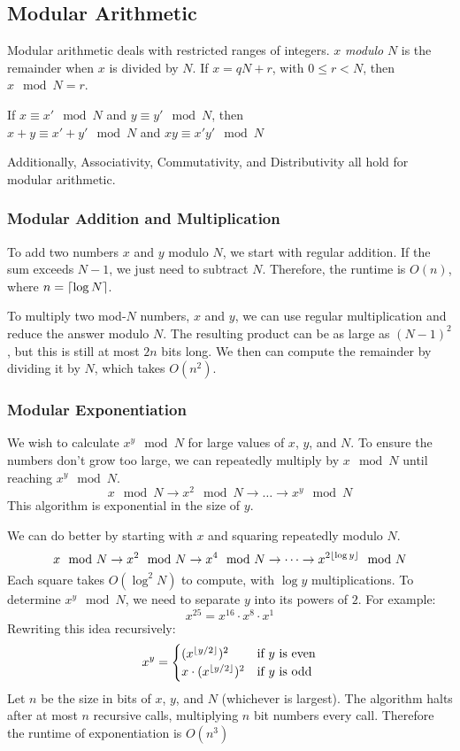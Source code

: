 \subsection{Modular Arithmetic}
Modular arithmetic deals with restricted ranges of integers. 
$x$ \emph{modulo} $N$ is the remainder when $x$ is divided by $N$. 
If $x = qN + r$, with $0 \leq r < N$, then $x \mod{N} = r$.
\begin{prop}
  If $x \equiv x' \mod{N}$ and $y \equiv y' \mod{N}$, then \\
  $x + y \equiv x' + y' \mod{N}$ and $xy \equiv x'y' \mod{N}$
\end{prop}
Additionally, Associativity, Commutativity, and Distributivity all hold for modular arithmetic.

\subsubsection{Modular Addition and Multiplication}
To add two numbers $x$ and $y$ modulo $N$, we start with regular addition.
If the sum exceeds $N-1$, we just need to subtract $N$. 
Therefore, the runtime is $O(n)$, where $n = \left\lceil{\log N}\right\rceil$.\par
To multiply two mod-$N$ numbers, $x$ and $y$, we can use regular multiplication and reduce the answer modulo $N$.
The resulting product can be as large as $(N-1)^2$, but this is still at most $2n$ bits long.
We then can compute the remainder by dividing it by $N$, which takes $O(n^2)$.

\subsubsection{Modular Exponentiation}
We wish to calculate $x^y \mod{N}$ for large values of $x$, $y$, and $N$.
To ensure the numbers don't grow too large, we can repeatedly multiply by $x \mod{N}$ until reaching $x^y \mod{N}$.
\[x \mod{N} \rightarrow x^2 \mod{N} \rightarrow \dots \rightarrow x^y \mod N\]
This algorithm is exponential in the size of $y$. \par
We can do better by starting with $x$ and squaring repeatedly modulo $N$.
\[x \mod{N} \rightarrow x^2 \mod{N} \rightarrow x^4 \mod N \rightarrow \dots \rightarrow x^{2 \left\lfloor{\log y}\right\rfloor} \mod N\]
Each square takes $O(\log^2 N)$ to compute, with $\log y$ multiplications.
To determine $x^y \mod N$, we need to separate $y$ into its powers of $2$.
For example:
\[x^{25} = x^{16} \cdot x^8 \cdot x^1\]
Rewriting this idea recursively:
\[ x^y = 
\begin{cases}
  (x^{\left\lfloor{y/2}\right\rfloor})^2 & \text{if $y$ is even} \\
  x \cdot (x^{\left\lfloor{y/2}\right\rfloor})^2 & \text{if $y$ is odd} \\
\end{cases}
\]
Let $n$ be the size in bits of $x$, $y$, and $N$ (whichever is largest).
The algorithm halts after at most $n$ recursive calls, multiplying $n$ bit numbers every call.
Therefore the runtime of exponentiation is $O(n^3)$

